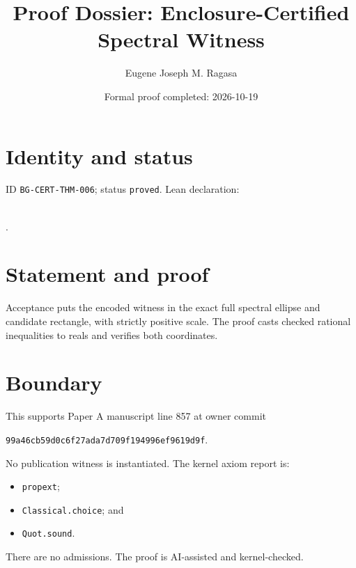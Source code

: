 \documentclass[11pt]{article}
\title{Proof Dossier: Enclosure-Certified Spectral Witness}\author{Eugene Joseph M. Ragasa}\date{Formal proof completed: 2026-10-19}
\begin{document}
\maketitle
\section{Identity and status}
ID \texttt{BG-CERT-THM-006}; status \texttt{proved}. Lean declaration:
\par{}\\
{\tiny{}}.
\section{Statement and proof}
Acceptance puts the encoded witness in the exact full spectral ellipse and candidate
rectangle, with strictly positive scale. The proof casts checked rational inequalities to
reals and verifies both coordinates.
\section{Boundary}
This supports Paper A manuscript line 857 at owner commit
\begin{center}\small\texttt{99a46cb59d0c6f27ada7d709f194996ef9619d9f}.\end{center}
No publication witness is instantiated. The kernel axiom report is:
\begin{itemize}
\item \texttt{propext};
\item \texttt{Classical.choice}; and
\item \texttt{Quot.sound}.
\end{itemize}
There are no admissions. The proof is AI-assisted and kernel-checked.
\end{document}
